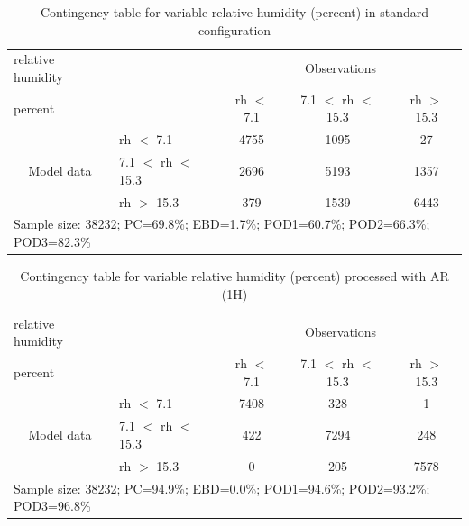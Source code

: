 \documentclass[a4paper,english]{article}
\begin{document}
\clearpage
\begin{table}[]
\begin{center}
\begin{tabular}{llccc}
\hline
{relative humidity}                                       &                                                    & \multicolumn{3}{c}{Observations}                 \\
{percent}                                       &                             & rh $<$ 7.1   & 7.1 $<$ rh $<$ 15.3 & rh $>$ 15.3 \\
\hline
\multicolumn{1}{c}{\multirow{3}{*}{Model data}}  & rh $<$ 7.1             & 4755                & 1095                       & 27              \\
                                                 & 7.1  $<$ rh $<$ 15.3 & 2696                & 5193                       & 1357              \\
                                                 & rh $>$ 15.3             & 379                & 1539                       & 6443              \\
\hline
\multicolumn{5}{l}{Sample size: 38232; PC=69.8\%; EBD=1.7\%; POD1=60.7\%; POD2=66.3\%; POD3=82.3\%}
\end{tabular}
\end{center}
\caption{Contingency table for variable relative humidity (percent) in standard configuration}
\label{tab:contingencyrhBEF}
\end{table}
\begin{table}[]
\begin{center}
\begin{tabular}{llccc}
\hline
{relative humidity}                                       &                                                    & \multicolumn{3}{c}{Observations}                 \\
{percent}                                       &                             & rh $<$ 7.1   & 7.1 $<$ rh $<$ 15.3 & rh $>$ 15.3 \\
\hline
\multicolumn{1}{c}{\multirow{3}{*}{Model data}}  & rh $<$ 7.1             & 7408                & 328                       & 1              \\
                                                 & 7.1  $<$ rh $<$ 15.3 & 422                & 7294                       & 248              \\
                                                 & rh $>$ 15.3             & 0                & 205                       & 7578              \\
\hline
\multicolumn{5}{l}{Sample size: 38232; PC=94.9\%; EBD=0.0\%; POD1=94.6\%; POD2=93.2\%; POD3=96.8\%}
\end{tabular}
\end{center}
\caption{Contingency table for variable relative humidity (percent) processed with AR (1H)}
\label{tab:contingencyrhAFT}
\end{table}
\end{document}
